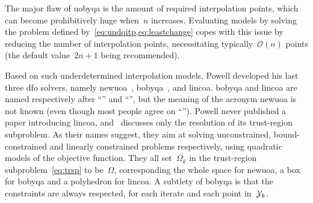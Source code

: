 \documentclass[11pt,draft]{article}
\numberwithin{equation}{section}
\newcommand{\fset}{\Omega}
\newcommand{\fsetm}[1][k]{\Omega_{#1}}
\newcommand{\xpt}[1][k]{\mathcal{Y}\ifthenelse{\equal{#1}{}}{}{_{#1}}}
\begin{document}
The major flaw of \gls{uobyqa} is the amount of required interpolation points, which can become prohibitively huge when~$n$ increases.
Evaluating models by solving the problem defined by~\cref{eq:undqitp,eq:leastchange} copes with this issue by reducing the number of interpolation points, necessitating typically~$\mathcal{O}(n)$ points (the default value~$2n + 1$ being recommended).

Based on such underdetermined interpolation models, Powell developed his last three \gls{dfo} solvers, namely \gls{newuoa}~\cite{Powell_2006, Powell_2008}, \gls{bobyqa}~\cite{Powell_2009}, and \gls{lincoa}.
\Gls{bobyqa} and \gls{lincoa} are named respectively after \enquote{} and \enquote{}, but the meaning of the acronym \gls{newuoa} is not known (even though most people agree on \enquote{}).
Powell never published a paper introducing \gls{lincoa}, and~\cite{Powell_2015} discusses only the resolution of its trust-region subproblem.
As their names suggest, they aim at solving unconstrained, bound-constrained and linearly constrained problems respectively, using quadratic models of the objective function.
They all set~$\fsetm$ in the trust-region subproblem~\cref{eq:trsp} to be~$\fset$, corresponding the whole space for \gls{newuoa}, a box for \gls{bobyqa} and a polyhedron for \gls{lincoa}.
A subtlety of \gls{bobyqa} is that the constraints are always respected, for each iterate and each point in~$\xpt$.
\end{document}
